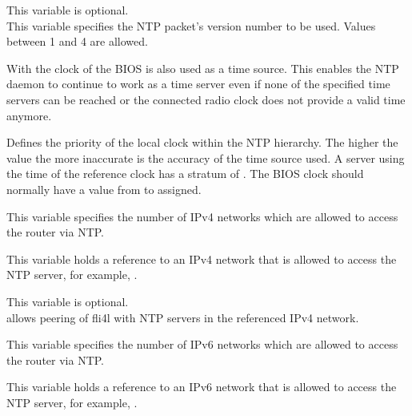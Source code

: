 \begin{description}
  This variable is optional.\\
  This variable specifies the NTP packet's version number to be used. Values
  between 1 and 4 are allowed.


  With  the clock of the BIOS is also used as a time source.
  This enables the NTP daemon to continue to work as a time server even if
  none of the specified time servers can be reached or the connected
  radio clock does not provide a valid time anymore.


  Defines the priority of the local clock within the NTP hierarchy.
  The higher the value the more inaccurate is the accuracy of the time source
  used. A server using the time of the reference clock has a stratum of
  . The BIOS clock should normally have a value from 
  to  assigned.


  This variable specifies the number of IPv4 networks which are allowed to
  access the router via NTP.


  This variable holds a reference to an IPv4 network that is allowed to access the
  NTP server, for example, .


  This variable is optional.\\
   allows peering of fli4l with NTP servers in the referenced IPv4 network.


  This variable specifies the number of IPv6 networks which are allowed to
  access the router via NTP.


  This variable holds a reference to an IPv6 network that is allowed to access the
  NTP server, for example, .



\end{description}

